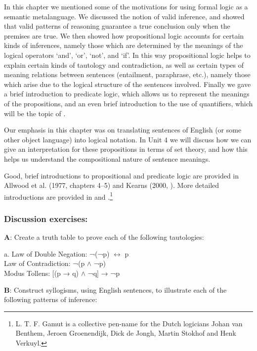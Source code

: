 In this chapter we mentioned some of the motivations for using formal logic as a semantic metalanguage. We discussed the notion of valid inference, and showed that valid patterns of reasoning guarantee a true conclusion only when the premises are true. We then showed how propositional logic accounts for certain kinds of inferences, namely those which are determined by the meanings of the logical operators ‘and’, ‘or’, ‘not’, and ‘if’. In this way propositional logic helps to explain certain kinds of tautology and contradiction, as well as certain types of meaning relations between sentences (entailment, paraphrase, etc.), namely those which arise due to the logical structure of the sentences involved. Finally we gave a brief introduction to predicate logic, which allows us to represent the meanings of the propositions, and an even brief introduction to the use of quantifiers, which will be the topic of .



Our emphasis in this chapter was on translating sentences of English (or some other object language) into logical notation. In Unit 4 we will discuss how we can give an interpretation for these propositions in terms of set theory, and how this helps us understand the compositional nature of sentence meanings.



\furtherreading



Good, brief introductions to propositional and predicate logic are provided in Allwood et al. (1977, chapters 4–5) and Kearns (2000, ). More detailed introductions are provided in \citet{Martin1987} and \citet{Gamut1991a}.\footnote{L. T. F. Gamut is a collective pen-name for the Dutch logicians Johan van Benthem, Jeroen Groenendijk, Dick de Jongh, Martin Stokhof and Henk Verkuyl.}


\subsubsection{Discussion exercises:}\label{sec:}
\ea
\textbf{A}: Create a truth table to prove each of the following tautologies:
\z

\ea
  a. Law of Double Negation:  ¬(¬p) $\leftrightarrow $ p\\
\ex Law of Contradiction:  ¬(p ${\wedge}$ ¬p)\\
\ex Modus Tollens:  [(p → q) ${\wedge}$ ¬q]  →  ¬p
\z

\ea
\textbf{B}: Construct syllogisms, using English sentences, to illustrate each of the following patterns of inference:
\z


